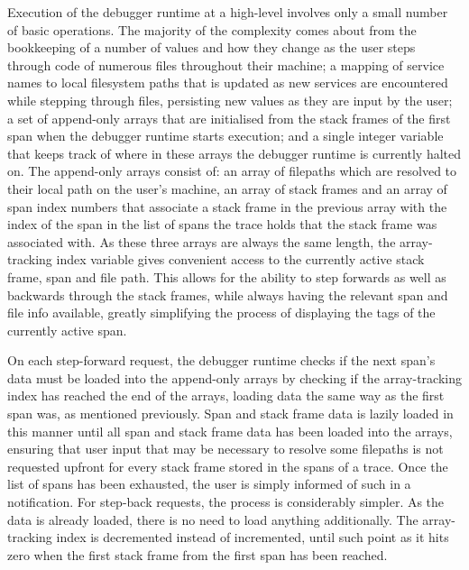 \documentclass[12pt,pdftex,titlepage]{report}
\begin{document}
            Execution of the debugger runtime at a high-level involves only a small number of basic operations. The majority of the complexity comes about from the bookkeeping of a number of values and how they change as the user steps 
            through code of numerous files throughout their machine; a mapping of service names to local filesystem paths that is updated as new services are encountered while stepping through files, persisting new values as they are input
            by the user; a set of append-only arrays that are initialised from the stack frames of the first span when the debugger runtime starts execution; and a single integer variable that keeps track of where in these arrays the debugger
            runtime is currently halted on. The append-only arrays consist of: an array of filepaths which are resolved to their local path on the user's machine, an array of stack frames and an array of span index numbers that associate a stack 
            frame in the previous array with the index of the span in the list of spans the trace holds that the stack frame was associated with. As these three arrays are always the same length, the array-tracking index variable gives convenient
            access to the currently active stack frame, span and file path. This allows for the ability to step forwards as well as backwards through the stack frames, while always having the relevant span and file info available, greatly 
            simplifying the process of displaying the tags of the currently active span.
            
            On each step-forward request, the debugger runtime checks if the next span's data must be loaded into the append-only arrays by checking if the array-tracking index has reached the end of the arrays, loading data the same way
            as the first span was, as mentioned previously. Span and stack frame data is lazily loaded in this manner until all span and stack frame data has been loaded into the arrays, ensuring that user input that may be necessary to resolve
            some filepaths is not requested upfront for every stack frame stored in the spans of a trace. Once the list of spans has been exhausted, the user is simply informed of such in a notification. For step-back requests, the process is
            considerably simpler. As the data is already loaded, there is no need to load anything additionally. The array-tracking index is decremented instead of incremented, until such point as it hits zero when the first stack frame from the
            first span has been reached.
\end{document}
